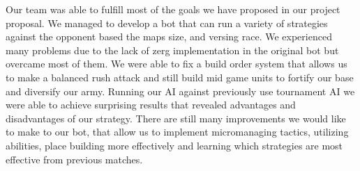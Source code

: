 \documentclass{article}
\begin{document}
Our team was able to fulfill most of the goals we have proposed in our project proposal. We managed to develop a bot that can run a variety of strategies against the opponent based the maps size, and versing race. We experienced many problems due to the lack of zerg implementation in the original bot but overcame most of them. We were able to fix a build order system that allows us to make a balanced rush attack and still build mid game units to fortify our base and diversify our army. Running our AI against previously use tournament AI we were able to achieve surprising results that revealed advantages and disadvantages of our strategy. There are still many improvements we would like to make to our bot, that allow us to implement micromanaging tactics, utilizing abilities, place building more effectively and learning which strategies are most effective from previous matches. 


\printbibliography
\end{document}
